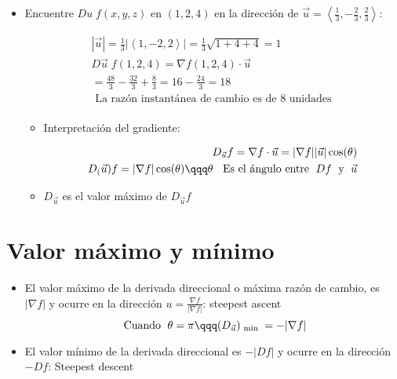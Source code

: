 \begin{enumerate}
\begin{itemize}
            \item Encuentre $Du\; f(x,y,z)$ en $(1,2,4)$ en la dirección de $\vec{u} = \left\langle \frac{1}{3}, -\frac{2}{3} , \frac{2}{3}  \right\rangle $:
                \begin{center}
                   \begin{align*}
                       \left| \vec{u} \right|  = \frac{1}{3} \left| \left\langle 1,-2,2 \right\rangle  \right| = \frac{1}{3} \sqrt{1+4+4} = 1 \\ 
                       D\vec{u} \; f(1,2,4) = \nabla f(1,2,4) \cdot \vec{u} \\ 
                       = \frac{48}{3} - \frac{32}{3} + \frac{8}{3} = 16 - \frac{24}{3} = 18 \\ 
                       \text{ La razón instantánea de cambio es de 8 unidades } \\ 
                   \end{align*}
                   \begin{itemize}
                       \item Interpretación del gradiente: 
                        \begin{center}
                           \begin{align*}
                               D_{\vec{u}} f = \nabla f \cdot \vec{u} = |\nabla f||\vec{u}| \cos (\theta) \\ 
                               D_(\vec{u}) f = |\nabla f|\cos (\theta)  \qqq \theta \;\; \text{ Es el ángulo entre } \; Df \; \text{ y } \; \vec{u}\\ 
                           \end{align*}
                        \end{center}
                        
                        \item $D_{\vec{u}}$ es el valor máximo de $D_{\vec{u}} f$
                   \end{itemize}
                \end{center}
        \end{itemize}
\end{enumerate}



\section{Valor máximo y mínimo}
\begin{itemize}
    \item El valor máximo de la derivada direccional o máxima razón de cambio, es $|\nabla f |$ y ocurre en la dirección $u = \frac{\nabla f }{|\nabla f |} $: steepest ascent
        \[
          \text{ Cuando  }\; \theta = \pi \qqq (D_{\vec{u}})_{\text{ min }} = -|\nabla f|
        \]
    
    \item El valor mínimo de la derivada direccional es $-|Df|$ y ocurre en la dirección $-Df$: Steepest descent 
\end{itemize}

